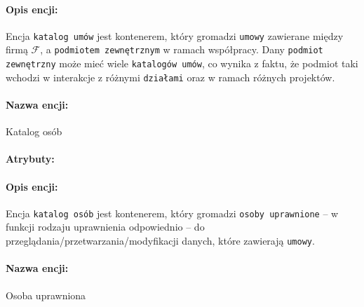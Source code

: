 \documentclass{article}
\begin{document}
\paragraph{Opis encji: \\}
Encja \texttt{katalog umów} jest kontenerem, który gromadzi \texttt{umowy} zawierane między firmą $\mathcal{F}$, a 
\texttt{podmiotem zewnętrznym} w ramach współpracy. Dany \texttt{podmiot zewnętrzny} może mieć wiele \texttt{katalogów umów}, co wynika z faktu, że podmiot taki wchodzi w interakcje z różnymi \texttt{działami} oraz w ramach różnych projektów.
\paragraph{Nazwa encji:\\ }
Katalog osób
\paragraph{Atrybuty:\\ }
\begin{table}[H]
\end{table}
\paragraph{Opis encji: \\}
Encja \texttt{katalog osób} jest kontenerem, który gromadzi \texttt{osoby uprawnione} -- w funkcji rodzaju uprawnienia odpowiednio -- do przeglądania/przetwarzania/modyfikacji danych, które zawierają \texttt{umowy}. 
\paragraph{Nazwa encji:\\ }
Osoba uprawniona
\end{document}
